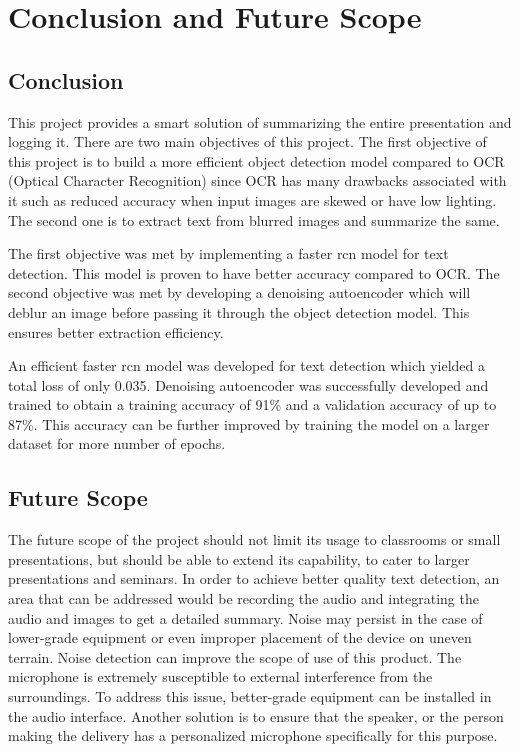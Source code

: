 \chapter{Conclusion and Future Scope}

\section{Conclusion}

This project provides a smart solution of summarizing the entire presentation and logging it. There are two main objectives of this project. The first objective of this project is to build a more efficient object detection model compared to OCR (Optical Character Recognition) since OCR has many drawbacks associated with it such as reduced accuracy when input images are skewed or have low lighting. The second one is to extract text from blurred images and summarize the same. 

The first objective was met by implementing a faster \acrshort{rcn} model for text detection. This model is proven to have better accuracy compared to OCR. The second objective was met by developing a denoising autoencoder which will deblur an image before passing it through the object detection model. This ensures better extraction efficiency. 

An efficient faster \acrshort{rcn} model was developed for text detection which yielded a total loss of only 0.035. Denoising autoencoder was successfully developed and trained to obtain a training accuracy of 91\% and a validation accuracy of up to 87\%. This accuracy can be further improved by training the model on a larger dataset for more number of epochs.



\section{Future Scope}
The future scope of the project should not limit its usage to classrooms or small presentations, but should be able to extend its capability, to cater to larger presentations and seminars. In order to achieve better quality text detection, an area that can be addressed would be recording the audio and integrating the audio and images to get a detailed summary. Noise may persist in the case of lower-grade equipment or even improper placement of the device on uneven terrain. Noise detection can improve the scope of use of this product. The microphone is extremely susceptible to external interference from the surroundings. To address this issue, better-grade equipment can be installed in the audio interface. Another solution is to ensure that the speaker, or the person making the delivery has a personalized microphone specifically for this purpose. \\

